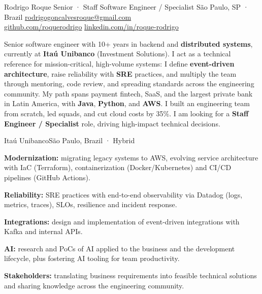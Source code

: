 \documentclass{resume}
\begin{document}
\cvheader
  {Rodrigo Roque}
  {Senior · Staff Software Engineer / Specialist}
  {São Paulo, SP · Brazil\cvsep
   \href{mailto:rodrigogoncalvesroque@gmail.com}{rodrigogoncalvesroque@gmail.com}\\
   \href{https://github.com/roquerodrigo}{github.com/roquerodrigo}\cvsep
   \href{https://linkedin.com/in/roque-rodrigo}{linkedin.com/in/roque-rodrigo}}


Senior software engineer with 10+ years in backend and \textbf{distributed systems},
currently at \textbf{Itaú Unibanco} (Investment Solutions). I act as a technical reference
for mission-critical, high-volume systems: I define \textbf{event-driven architecture},
raise reliability with \textbf{SRE} practices, and multiply the team through mentoring,
code review, and spreading standards across the engineering community. My path spans
payment fintech, SaaS, and the largest private bank in Latin America, with \textbf{Java},
\textbf{Python}, and \textbf{AWS}. I built an engineering team from scratch, led squads,
and cut cloud costs by 35\%. I am looking for a \textbf{Staff Engineer / Specialist} role,
driving high-impact technical decisions.


        {Itaú Unibanco}{São Paulo, Brazil · Hybrid}
\begin{cvitems}
  \item \textbf{Modernization:} migrating legacy systems to AWS, evolving service
        architecture with IaC (Terraform), containerization (Docker/Kubernetes) and
        CI/CD pipelines (GitHub Actions).
  \item \textbf{Reliability:} SRE practices with end-to-end observability via Datadog
        (logs, metrics, traces), SLOs, resilience and incident response.
  \item \textbf{Integrations:} design and implementation of event-driven integrations
        with Kafka and internal APIs.
  \item \textbf{AI:} research and PoCs of AI applied to the business and the development
        lifecycle, plus fostering AI tooling for team productivity.
  \item \textbf{Stakeholders:} translating business requirements into feasible technical
        solutions and sharing knowledge across the engineering community.
\end{cvitems}
\end{document}
